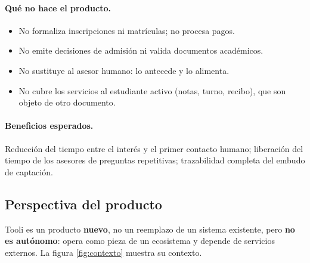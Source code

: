\documentclass[12pt,a4paper]{report}
\begin{document}
\paragraph{Qué no hace el producto.}
\begin{itemize}[itemsep=2pt]
    \item No formaliza inscripciones ni matrículas; no procesa pagos.
    \item No emite decisiones de admisión ni valida documentos académicos.
    \item No sustituye al asesor humano: lo antecede y lo alimenta.
    \item No cubre los servicios al estudiante activo (notas, turno, recibo), que son objeto de otro
    documento.
\end{itemize}

\paragraph{Beneficios esperados.} Reducción del tiempo entre el interés y el primer contacto humano;
liberación del tiempo de los asesores de preguntas repetitivas; trazabilidad completa del embudo de
captación.

\subsection{Perspectiva del producto}

Tooli es un producto \textbf{nuevo}, no un reemplazo de un sistema existente, pero \textbf{no es
autónomo}: opera como pieza de un ecosistema y depende de servicios externos. La figura
\ref{fig:contexto} muestra su contexto.
\end{document}

